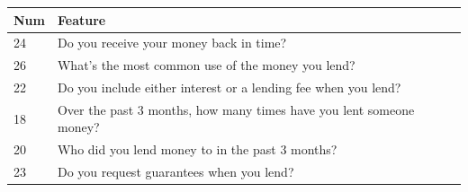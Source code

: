 \begin{longtable}[]{@{}ll@{}}
\toprule
\begin{minipage}[b]{0.05\columnwidth}\raggedright
Num\strut
\end{minipage} & \begin{minipage}[b]{0.89\columnwidth}\raggedright
Feature\strut
\end{minipage}\tabularnewline
\midrule
\endhead
\begin{minipage}[t]{0.05\columnwidth}\raggedright
24\strut
\end{minipage} & \begin{minipage}[t]{0.89\columnwidth}\raggedright
Do you receive your money back in time?\strut
\end{minipage}\tabularnewline
\begin{minipage}[t]{0.05\columnwidth}\raggedright
26\strut
\end{minipage} & \begin{minipage}[t]{0.89\columnwidth}\raggedright
What's the most common use of the money you lend?\strut
\end{minipage}\tabularnewline
\begin{minipage}[t]{0.05\columnwidth}\raggedright
22\strut
\end{minipage} & \begin{minipage}[t]{0.89\columnwidth}\raggedright
Do you include either interest or a lending fee when you lend?\strut
\end{minipage}\tabularnewline
\begin{minipage}[t]{0.05\columnwidth}\raggedright
18\strut
\end{minipage} & \begin{minipage}[t]{0.89\columnwidth}\raggedright
Over the past 3 months, how many times have you lent someone
money?\strut
\end{minipage}\tabularnewline
\begin{minipage}[t]{0.05\columnwidth}\raggedright
20\strut
\end{minipage} & \begin{minipage}[t]{0.89\columnwidth}\raggedright
Who did you lend money to in the past 3 months?\strut
\end{minipage}\tabularnewline
\begin{minipage}[t]{0.05\columnwidth}\raggedright
23\strut
\end{minipage} & \begin{minipage}[t]{0.89\columnwidth}\raggedright
Do you request guarantees when you lend?\strut

\end{minipage}
\end{longtable}

